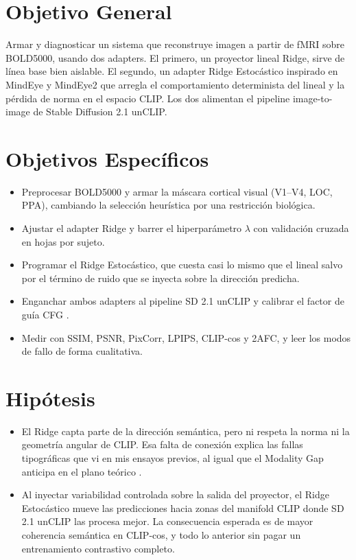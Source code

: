\section{Objetivo General}

Armar y diagnosticar un sistema que reconstruye imagen a partir de fMRI sobre BOLD5000, 
usando dos adapters. El primero, un proyector lineal Ridge, sirve de línea base 
bien aislable. El segundo, un adapter Ridge Estocástico inspirado en MindEye y 
MindEye2 que arregla el comportamiento determinista del lineal y la pérdida de norma 
en el espacio CLIP. Los dos alimentan el pipeline image-to-image de Stable Diffusion 2.1 
unCLIP.

\section{Objetivos Específicos}

\begin{itemize}
\item[•] Preprocesar BOLD5000 y armar la máscara cortical visual (V1--V4, LOC, PPA), 
cambiando la selección heurística por una restricción biológica.
\item[•] Ajustar el adapter Ridge y barrer el hiperparámetro $\lambda$ con validación 
cruzada en hojas por sujeto.
\item[•] Programar el Ridge Estocástico, que cuesta casi lo mismo que el lineal salvo 
por el término de ruido que se inyecta sobre la dirección predicha.
\item[•] Enganchar ambos adapters al pipeline SD 2.1 unCLIP y calibrar el factor de guía 
CFG \cite{ho2022classifier}.
\item[•] Medir con SSIM, PSNR, PixCorr, LPIPS, CLIP-cos y 2AFC, y leer los modos de 
fallo de forma cualitativa.
\end{itemize}

\section{Hipótesis}

\begin{itemize}
\item[H1.] El Ridge capta parte de la dirección semántica, pero ni respeta la norma ni 
la geometría angular de CLIP. Esa falta de conexión explica las fallas tipográficas que vi en mis 
ensayos previos, al igual que el Modality Gap anticipa en el plano teórico 
\cite{liang2022mind}.
\item[H2.] Al inyectar variabilidad controlada sobre la salida del proyector, el Ridge 
Estocástico mueve las predicciones hacia zonas del manifold CLIP donde SD 2.1 unCLIP las 
procesa mejor. La consecuencia esperada es de mayor coherencia semántica en CLIP-cos, y 
todo lo anterior sin pagar un entrenamiento contrastivo completo.
\end{itemize}

